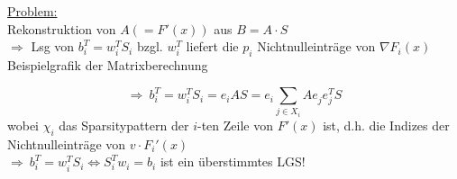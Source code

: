 \noindent
\underline{Problem:}\\
Rekonstruktion von $A (=F'(x))$ aus $B=A\cdot S$\\
$\Rightarrow$ Lsg von $b_i^T = w_i^TS_i$ bzgl. $w_i^T$ liefert die $p_i$ Nichtnulleinträge von $\nabla F_i(x)$\\
Beispielgrafik der Matrixberechnung\\
\vspace{3cm}


$$\Rightarrow\ b_i^T =w_i^TS_i = e_i A S = e_i \sum_{j \in X_i} Ae_j^{}e_j^TS$$
wobei  $\chi_i$ das Sparsitypattern der $i$-ten Zeile von $F'(x)$ ist, d.h. die Indizes der Nichtnulleinträge von $v\cdot F_i'(x)$\\
$\Rightarrow\ b_i^T =w_i^TS_i \Leftrightarrow S_i^Tw_i = b_i$ ist ein überstimmtes LGS!\\

